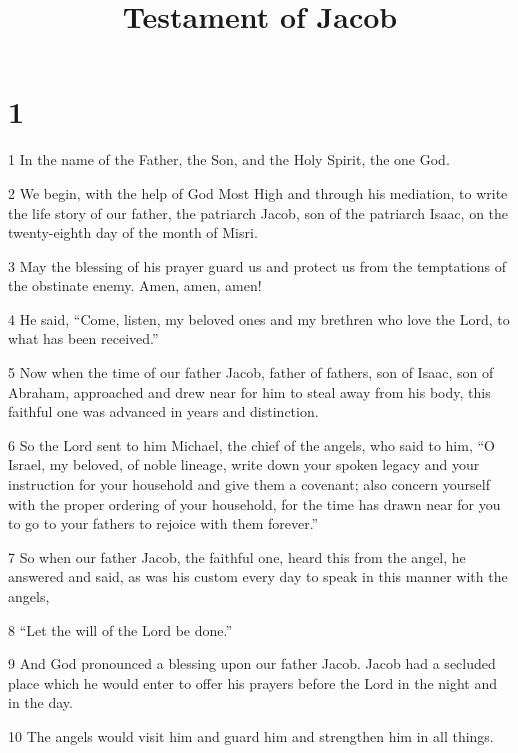 


\title{Testament of Jacob}

\chapter{1}

\par 1 In the name of the Father, the Son, and the Holy Spirit, the one God. 

\par 2 We begin, with the help of God Most High and through his mediation, to write the life story of our father, the patriarch Jacob, son of the patriarch Isaac, on the twenty-eighth day of the month of Misri. 

\par 3 May the blessing of his prayer guard us and protect us from the temptations of the obstinate enemy. Amen, amen, amen! 

\par 4 He said, “Come, listen, my beloved ones and my brethren who love the Lord, to what has been received.” 

\par 5 Now when the time of our father Jacob, father of fathers, son of Isaac, son of Abraham, approached and drew near for him to steal away from his body, this faithful one was advanced in years and distinction. 

\par 6 So the Lord sent to him Michael, the chief of the angels, who said to him, “O Israel, my beloved, of noble lineage, write down your spoken legacy and your instruction for your household and give them a covenant; also concern yourself with the proper ordering of your household, for the time has drawn near for you to go to your fathers to rejoice with them forever.”

\par 7 So when our father Jacob, the faithful one, heard this from the angel, he answered and said, as was his custom every day to speak in this manner with the angels, 

\par 8 “Let the will of the Lord be done.” 

\par 9 And God pronounced a blessing upon our father Jacob. Jacob had a secluded place which he would enter to offer his prayers before the Lord in the night and in the day. 

\par 10 The angels would visit him and guard him and strengthen him in all things. 

